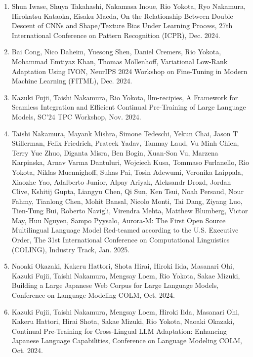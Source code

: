 \documentclass[margin,line]{cv}
\begin{document}
\begin{resume}
\begin{enumerate}
\item Shun Iwase, Shuya Takahashi, Nakamasa Inoue, Rio Yokota, Ryo Nakamura, Hirokatsu Kataoka, Eisaku Maeda, On the Relationship Between Double Descent of CNNs and Shape/Texture Bias Under Learning Process, 27th International Conference on Pattern Recognition (ICPR), Dec. 2024.

\item Bai Cong, Nico Daheim, Yuesong Shen, Daniel Cremers, Rio Yokota, Mohammad Emtiyaz Khan, Thomas M\"{o}llenhoff, Variational Low-Rank Adaptation Using IVON, NeurIPS 2024 Workshop on Fine-Tuning in Modern Machine Learning (FITML), Dec. 2024.

\item Kazuki Fujii, Taishi Nakamura, Rio Yokota, llm-recipies, A Framework for Seamless Integration and Efficient Continual Pre-Training of Large Language Models, SC’24 TPC Workshop, Nov. 2024.

\item Taishi Nakamura, Mayank Mishra, Simone Tedeschi, Yekun Chai, Jason T Stillerman, Felix Friedrich, Prateek Yadav, Tanmay Laud, Vu Minh Chien, Terry Yue Zhuo, Diganta Misra, Ben Bogin, Xuan-Son Vu, Marzena Karpinska, Arnav Varma Dantuluri, Wojciech Kusa, Tommaso Furlanello, Rio Yokota, Niklas Muennighoff, Suhas Pai, Tosin Adewumi, Veronika Laippala, Xiaozhe Yao, Adalberto Junior, Alpay Ariyak, Aleksandr Drozd, Jordan Clive, Kshitij Gupta, Liangyu Chen, Qi Sun, Ken Tsui, Noah Persaud, Nour Fahmy, Tianlong Chen, Mohit Bansal, Nicolo Monti, Tai Dang, Ziyang Luo, Tien-Tung Bui, Roberto Navigli, Virendra Mehta, Matthew Blumberg, Victor May, Huu Nguyen, Sampo Pyysalo, Aurora-M: The First Open Source Multilingual Language Model Red-teamed according to the U.S. Executive Order, The 31st International Conference on Computational Linguistics (COLING), Industry Track, Jan. 2025.

\item Naoaki Okazaki, Kakeru Hattori, Shota Hirai, Hiroki Iida, Masanari Ohi, Kazuki Fujii, Taishi Nakamura, Mengsay Loem, Rio Yokota, Sakae Mizuki, Building a Large Japanese Web Corpus for Large Language Models, Conference on Language Modeling COLM, Oct. 2024.

\item Kazuki Fujii, Taishi Nakamura, Mengsay Loem, Hiroki Iida, Masanari Ohi, Kakeru Hattori, Hirai Shota, Sakae Mizuki, Rio Yokota, Naoaki Okazaki, Continual Pre-Training for Cross-Lingual LLM Adaptation: Enhancing Japanese Language Capabilities, Conference on Language Modeling COLM, Oct. 2024.


\end{enumerate}
\end{resume}
\end{document}
